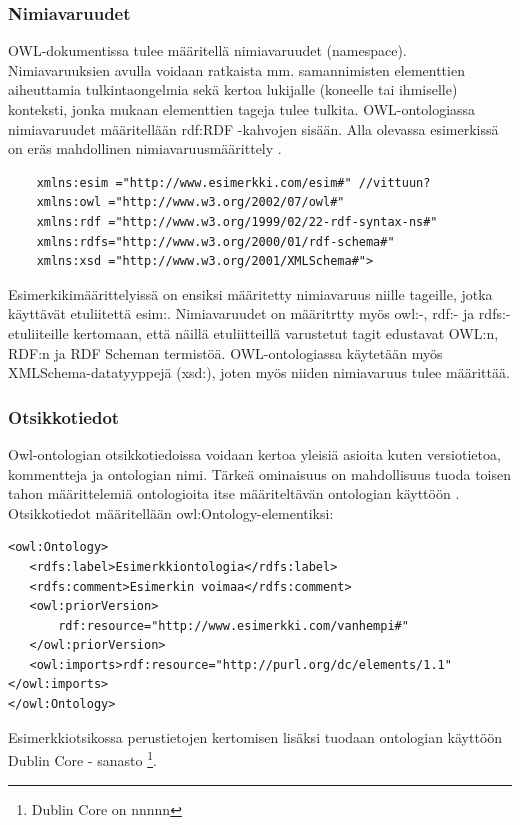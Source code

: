 \documentclass[finnish]{tktltiki2}
\theoremstyle{definition}
\theoremstyle{remark}
\begin{document}
\subsubsection{Nimiavaruudet}
OWL-dokumentissa tulee määritellä nimiavaruudet (namespace). Nimiavaruuksien
avulla voidaan ratkaista mm. samannimisten elementtien aiheuttamia
tulkintaongelmia sekä kertoa lukijalle (koneelle tai ihmiselle) konteksti, jonka
mukaan elementtien tageja tulee tulkita. OWL-ontologiassa nimiavaruudet
määritellään rdf:RDF -kahvojen sisään.  Alla olevassa esimerkissä on eräs mahdollinen nimiavaruusmäärittely . 
\begin{verbatim}
    xmlns:esim ="http://www.esimerkki.com/esim#" //vittuun?
    xmlns:owl ="http://www.w3.org/2002/07/owl#"
    xmlns:rdf ="http://www.w3.org/1999/02/22-rdf-syntax-ns#"
    xmlns:rdfs="http://www.w3.org/2000/01/rdf-schema#"
    xmlns:xsd ="http://www.w3.org/2001/XMLSchema#">
\end{verbatim}
Esimerkikimäärittelyissä on ensiksi määritetty nimiavaruus niille tageille, jotka käyttävät etuliitettä esim:. 
Nimiavaruudet on määritrtty myös owl:-, rdf:- ja rdfs:-etuliiteille kertomaan, että näillä
etuliitteillä varustetut tagit edustavat OWL:n, RDF:n ja RDF Scheman termistöä.
OWL-ontologiassa käytetään myös XMLSchema-datatyyppejä (xsd:), joten myös niiden
nimiavaruus tulee määrittää. 

\subsubsection{Otsikkotiedot}
Owl-ontologian otsikkotiedoissa voidaan kertoa yleisiä asioita kuten versiotietoa, kommentteja ja ontologian nimi. Tärkeä ominaisuus on mahdollisuus tuoda toisen tahon määrittelemiä ontologioita itse määriteltävän ontologian käyttöön \cite{SWM04}. Otsikkotiedot määritellään owl:Ontology-elementiksi: 
\begin{verbatim}
<owl:Ontology>
   <rdfs:label>Esimerkkiontologia</rdfs:label>
   <rdfs:comment>Esimerkin voimaa</rdfs:comment>
   <owl:priorVersion>
       rdf:resource="http://www.esimerkki.com/vanhempi#"
   </owl:priorVersion>
   <owl:imports>rdf:resource="http://purl.org/dc/elements/1.1"</owl:imports>
</owl:Ontology>
\end{verbatim}
Esimerkkiotsikossa perustietojen kertomisen lisäksi tuodaan ontologian käyttöön Dublin Core - sanasto  \footnote{Dublin Core on nnnnn}. 
\end{document}
